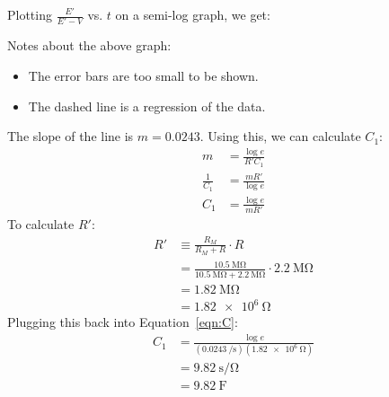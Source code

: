 \documentclass[11pt]{article}
\begin{document}
            Plotting $\frac{E'}{E'-V}$ vs. $t$ on a semi-log graph, we get:
            \begin{center}
            \end{center}
            Notes about the above graph:
            \begin{itemize}
                \item The error bars are too small to be shown.
                \item The dashed line is a regression of the data.
            \end{itemize}
            The slope of the line is $m=0.0243$. Using this, we can calculate $C_1$:
            \begin{align}
                m&=\frac{\log{e}}{R'C_1} \\
                \frac{1}{C_1}&=\frac{mR'}{\log{e}} \\
                C_1&=\frac{\log{e}}{mR'} \label{eqn:C}
            \end{align}
            To calculate $R'$:
            \begin{align}
                R'&\equiv\frac{R_M}{R_M+R}\cdot R \\
                &=\frac{\SI{10.5}{\mega\ohm}}{\SI{10.5}{\mega\ohm}+\SI{2.2}{\mega\ohm}}\cdot\SI{2.2}{\mega\ohm} \\
                &=\SI{1.82}{\mega\ohm} \\
                &=\SI{1.82e6}{\ohm}
            \end{align}
            Plugging this back into Equation~\ref{eqn:C}:
            \begin{align}
                C_1&=\frac{\log{e}}{(\SI{0.0243}{\per\second})(\SI{1.82e6}{\ohm})} \\
                &=\SI{9.82}{\second\per\ohm} \\
                &=\SI{9.82}{\farad}
            \end{align}
\end{document}
